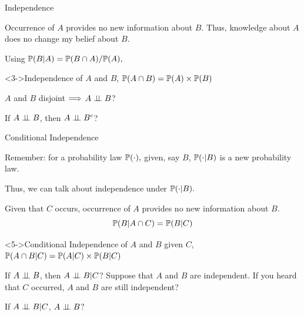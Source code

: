\documentclass[fleqn,aspectratio=169]{beamer}
\begin{document}
\begin{frame}{Independence}

\plitemsep 0.05in
\bci 

\item<1-> Occurrence of $A$ provides no new information about $B.$ Thus, knowledge about $A$ does no change my belief about $B.$ 

\item Using $\mathbb{P}( B | A ) = \mathbb{P}( B \cap A )/\mathbb{P}( A ),$ 

\begin{block}<3->{Independence of $A$ and $B$, }
$\mathbb{P}( A \cap B ) = \mathbb{P}( A ) \times \mathbb{P}( B )$
\end{block}

\item<5->  $A$ and $B$ disjoint $\Longrightarrow$ $A \perp \!\!\! \perp B$?


\item<7->  If $A \perp \!\!\! \perp B$,  then $A \perp \!\!\! \perp B^c$?  
\eci 
\end{frame}

\begin{frame}{Conditional Independence}

\plitemsep 0.07in
\bci 

\item<2-> Remember: for a probability law $\mathbb{P}( \cdot ),$ given, say $B$, $\mathbb{P}( \cdot | B )$ is a new probability law. 

\item<3-> Thus, we can talk about independence under $\mathbb{P}( \cdot | B ).$

\item<4-> Given that $C$ occurs, occurrence of $A$ provides no new information about $B.$
$$
\mathbb{P}( B | A \cap C ) = \mathbb{P}( B | C )
$$
\vspace{-0.2in}
\begin{block}<5->{Conditional Independence of $A$ and $B$ given $C$, }
$\mathbb{P}( A \cap B | C ) = \mathbb{P}( A |C ) \times \mathbb{P}( B |C )$
\end{block}

\smallskip
\item<7->  If $A \perp \!\!\! \perp B$,  then $A \perp \!\!\! \perp B | C$?
Suppose that $A$ and $B$ are independent. If you heard that $C$ occurred,  $A$ and $B$ are still independent?                                                         

\item<8->  If $A \perp \!\!\! \perp B | C$, $A \perp \!\!\! \perp B$?
\eci 
\end{frame}
\end{document}
